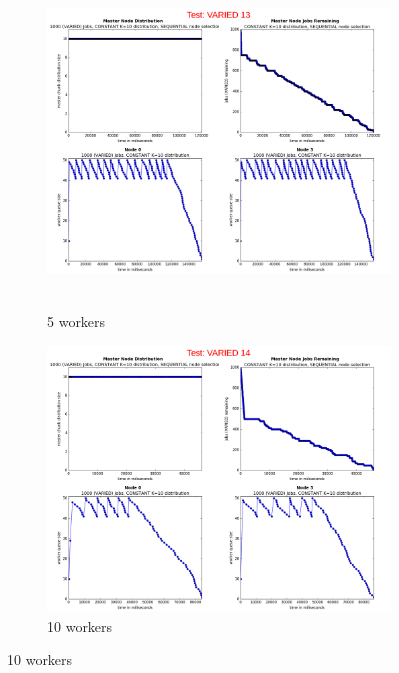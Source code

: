 \documentclass{article}
\begin{document}



\begin{figure}[p] 
  \begin{subfigure}[b]{0.5\linewidth}
    \centering
    \hbox{\hspace{-5.0em} \includegraphics[width=1.2\linewidth]{combined_varied_growing_workers_constant/case_varied_13} }
    \caption{5 workers}
    \label{testConstantVaried5} 
    \vspace{4ex}
  \end{subfigure}%
  \begin{subfigure}[b]{0.5\linewidth}
    \centering
    \includegraphics[width=1.2\linewidth]{combined_varied_growing_workers_constant/case_varied_14} 
    \caption{10 workers} 
    \label{testConstantVaried10} 
    \vspace{4ex}
  \end{subfigure} 
  

\end{figure}
\end{document}
